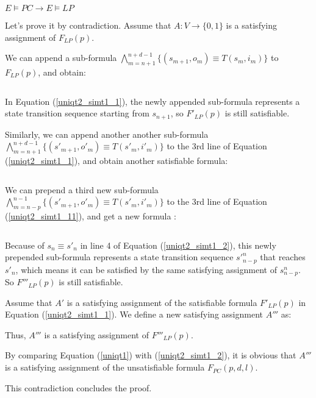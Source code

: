 \documentclass[journal]{IEEEtran}
\begin{document}
\begin{theorem}\label{R1}
$E\vDash PC\to E\vDash LP$
\end{theorem}
\begin{IEEEproof}
Let's prove it by contradiction.
Assume that $A:V\to \{0,1\}$ is a satisfying assignment of ${F_{LP}(p)}$.

We can append a sub-formula $\bigwedge_{m=n+1}^{n+d-1}
\{
(s_{m+1},o_m)\equiv T(s_m,i_m)
\}$
to ${F_{LP}(p)}$,
and obtain:

\begin{equation}\label{uniqt2_simt1_1}
\end{equation}

In Equation (\ref{uniqt2_simt1_1}),
the newly appended sub-formula represents a state transition sequence starting from $s_{n+1}$,
so $F'_{LP}(p)$ is still satisfiable.

Similarly,
we can append another another sub-formula $\bigwedge_{m=n+1}^{n+d-1}
\{
(s'_{m+1},o'_m)\equiv T(s'_m,i'_m)
\}$ to the 3rd line of Equation (\ref{uniqt2_simt1_1}),
and obtain another satisfiable formula:

\begin{equation}\label{uniqt2_simt1_11}
\end{equation}

We can prepend a third new sub-formula $\bigwedge_{m=n-p}^{n-1}
\{
(s'_{m+1},o'_m)\equiv T(s'_m,i'_m)
\}$ to the 3rd line of Equation (\ref{uniqt2_simt1_11}),
and get a new formula :

\begin{equation}\label{uniqt2_simt1_2}
\end{equation}

Because of $s_n\equiv s'_n$ in line 4 of Equation (\ref{uniqt2_simt1_2}),
this newly prepended sub-formula represents a state transition sequence $s'^{n}_{n-p}$ that reaches $s'_n$,
which means it can be satisfied by the same satisfying assignment of $s^{n}_{n-p}$.
So $F'''_{LP}(p)$ is still satisfiable.

Assume that $A'$ is a satisfying assignment of the satisfiable formula $F'_{LP}(p)$ in Equation (\ref{uniqt2_simt1_1}).
We define a new satisfying assignment $A'''$ as:
\begin{equation}
\end{equation}

Thus,
$A'''$ is a satisfying assignment of $F'''_{LP}(p)$.

By comparing Equation (\ref{uniqt1}) with (\ref{uniqt2_simt1_2}),
it is obvious that $A'''$ is a satisfying assignment of the unsatisfiable formula ${F_{PC}(p,d,l)}$.

This contradiction concludes the proof.
\end{IEEEproof}
\end{document}
